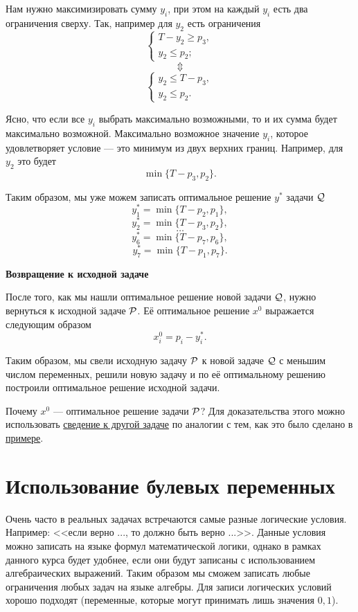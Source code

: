 Нам нужно максимизировать сумму $y_i$, при этом на каждый $y_i$ есть два ограничения сверху. Так, например для $y_2$ есть ограничения
\[
\begin{cases}
	T - y_2 \ge p_3, \\
	y_2 \le p_2;
\end{cases}
\]
\[
\Updownarrow
\]
\[
\begin{cases}
	y_2 \le T - p_3, \\
	y_2 \le p_2.
\end{cases}
\]

Ясно, что если все $y_i$ выбрать максимально возможными, то и их сумма будет максимально возможной. Максимально возможное значение $y_i$, которое удовлетворяет условие --- это минимум из двух верхних границ. Например, для $y_2$ это будет
\[
	\min\{T - p_3, p_2\}.
\]

Таким образом, мы уже можем записать оптимальное решение $y^*$ задачи $\Q$
\[
y_1^* = \min\{T - p_2, p_1\},
\]
\[
y_2^* = \min\{T - p_3, p_2\},
\]
\[
\dots
\]
\[
y_6^* = \min\{T - p_7, p_6\},
\]
\[
y_7^* = \min\{T - p_1, p_7\}.
\]

\textbf{Возвращение к исходной задаче}

После того, как мы нашли оптимальное решение новой задачи $\Q$, нужно вернуться к исходной задаче $\P$. Её оптимальное решение $x^0$ выражается следующим образом
\[
x_i^0 = p_i - y_i^*.
\]

Таким образом, мы свели исходную задачу $\P$ к новой задаче $\Q$ с меньшим числом переменных, решили новую задачу и по её оптимальному решению построили оптимальное решение исходной задачи.

Почему $x^0$ --- оптимальное решение задачи $\P$? Для доказательства этого можно использовать \hyperref[fact:reduction_to_other_problem]{сведение к другой задаче} по аналогии с тем, как это было сделано в \hyperref[ex:reduction_to_other_problem]{примере}.

\section{Использование булевых переменных}

\begin{note}
Очень часто в реальных задачах встречаются самые разные логические условия. Например: <<если верно ..., то должно быть верно ...>>. Данные условия можно записать на языке формул математической логики, однако в рамках данного курса будет удобнее, если они будут записаны с использованием алгебраических выражений. Таким образом мы сможем записать любые ограничения любых задач на языке алгебры. Для записи логических условий хорошо подходят  (переменные, которые могут принимать лишь значения $0, 1$).
\end{note}

